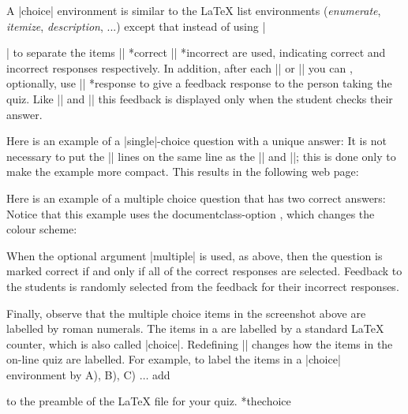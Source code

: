 \documentclass[svgnames]{article}
\makeatletter
\newcommand\macroIndex[1]{%
  \lowercase{\def\temp{#1}}%
  \expandafter\index\expandafter{\temp@\textbackslash#1}%
}
\makeatother
\begin{document}
A \LatexCode|choice| environment is similar to the \LaTeX{} list environments
(\textit{enumerate}, \textit{itemize}, \textit{description}, ...) except
that instead of using \LatexCode|\item| to separate the items
\LatexCode|\correct| *{correct}
\LatexCode|\incorrect| *{incorrect} are
used, indicating correct and incorrect responses respectively.
In addition, after each \LatexCode|\correct| or \LatexCode|\incorrect|
you can , optionally, use
\LatexCode|\response| *{response}
to give a feedback response to the person taking the quiz. Like
\LatexCode|\whenRight| and \LatexCode|\whenWrong| this feedback is
displayed only when the student checks their answer.

Here is an example of a \LatexCode|single|-choice question with a unique answer:
It is not necessary to put the \LatexCode|\response| lines on the same
line as the \LatexCode|\incorrect| and \LatexCode|\incorrect|; this is
done only to make the example more compact. This results in the
following web page:

Here is an example of a multiple choice question that has
two correct answers:
  \label{choice-multiple}
Notice that this example uses the documentclass-option
, which changes the colour scheme:

When the optional argument \LatexCode|multiple| is used, as above, then the
question is marked correct if and only if all of the correct responses
are selected. Feedback to the students is randomly selected from the
feedback for their incorrect responses.

Finally, observe that the multiple choice items in the screenshot above
are labelled by roman numerals. The items in a  are
labelled by a standard \LaTeX{} counter, which is also called
\LatexCode|choice|. Redefining \LatexCode|\thechoice| changes how the
items in the on-line quiz are labelled. For example, to label the items
in a \LatexCode|choice| environment by A), B), C) $\dots$ add
\begin{latexcode}
  \renewcommand\thechoice{\Alph{choice})}
\end{latexcode}
to the preamble of the \LaTeX{} file for your quiz.
*{thechoice}\macroIndex{thechoice}
\end{document}
